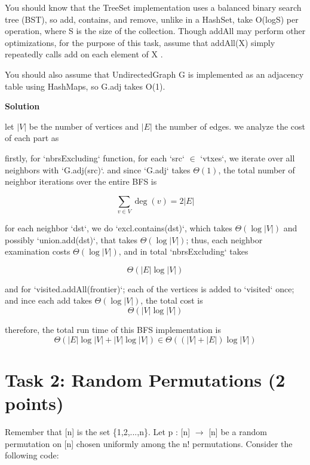 \documentclass{article}
\newcommand{\solution}{\textbf{\large Solution}}
\theoremstyle{remark}
\begin{document}
You should know that the TreeSet implementation uses a balanced binary search tree (BST), so
add, contains, and remove, unlike in a HashSet, take O(logS) per operation, where S is the size of the
collection. Though addAll may perform other optimizations, for the purpose of this task, assume that
addAll(X) simply repeatedly calls add on each element of X .

You should also assume that UndirectedGraph G is implemented as an adjacency table using
HashMaps, so G.adj takes O(1).

\medskip
\solution

let $|V|$ be the number of vertices and $|E|$ the number of edges. we analyze the cost of each part as

\vspace{1em}

firstly, for `nbrsExcluding` function, for each `src` $\in$ `vtxes`, we iterate over all neighbors with `G.adj(src)`. and since `G.adj` takes $\Theta(1)$, the total number of neighbor iterations over the entire BFS is

\[
\sum_{v \in V} \deg(v) = 2|E|
\]

for each neighbor `dst`, we do `excl.contains(dst)`, which takes $\Theta(\log |V|)$ and possibly `union.add(dst)`, that takes $\Theta(\log |V|)$; thus, each neighbor examination costs $\Theta(\log |V|)$, and in total `nbrsExcluding` takes

\[
\Theta(|E| \log |V|)
\]

\vspace{1em}

and for `visited.addAll(frontier)`; each of the vertices is added to `visited` once; and ince each add takes $\Theta(\log |V|)$, the total cost is
\[
\Theta(|V| \log |V|)
\]

\vspace{1em}

therefore, the total run time of this BFS implementation is 
\[
    \Theta(|E| \log |V| + |V| \log |V|) \in \boxed{\Theta((|V| + |E|)\log |V|)}
\]

\vspace{1em}
\hrulefill

\section*{Task 2: Random Permutations (2 points)}

Remember that [n] is the set \{1,2,...,n\}. Let p : [n] $\to$ [n] be a random permutation on [n] chosen
uniformly among the n! permutations. Consider the following code:
\end{document}
